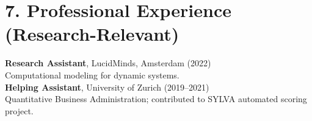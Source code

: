 \documentclass{nfr}
\begin{document}
\section*{7. Professional Experience (Research-Relevant)}

\textbf{Research Assistant}, LucidMinds, Amsterdam (2022) \\
Computational modeling for dynamic systems.\\

\textbf{Helping Assistant}, University of Zurich (2019--2021) \\
Quantitative Business Administration; contributed to SYLVA automated scoring project.\\


% 
% 
% 
% 





\end{document}
